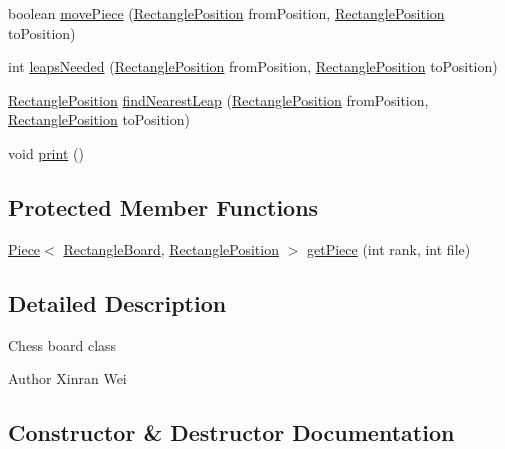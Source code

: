 \begin{DoxyCompactItemize}
\item 
boolean \hyperlink{classedu_1_1xwei12_1_1chess_1_1_rectangle_board_a476071ffa5222be6ea71f3fb82b7b8ff}{move\+Piece} (\hyperlink{classedu_1_1xwei12_1_1chess_1_1_rectangle_position}{Rectangle\+Position} from\+Position, \hyperlink{classedu_1_1xwei12_1_1chess_1_1_rectangle_position}{Rectangle\+Position} to\+Position)
\item 
int \hyperlink{classedu_1_1xwei12_1_1chess_1_1_rectangle_board_aeab8a752a9ea5b21569eff6decb53fd7}{leaps\+Needed} (\hyperlink{classedu_1_1xwei12_1_1chess_1_1_rectangle_position}{Rectangle\+Position} from\+Position, \hyperlink{classedu_1_1xwei12_1_1chess_1_1_rectangle_position}{Rectangle\+Position} to\+Position)
\item 
\hyperlink{classedu_1_1xwei12_1_1chess_1_1_rectangle_position}{Rectangle\+Position} \hyperlink{classedu_1_1xwei12_1_1chess_1_1_rectangle_board_ac0e3b5328b0ff0ac5dbc39688817da8c}{find\+Nearest\+Leap} (\hyperlink{classedu_1_1xwei12_1_1chess_1_1_rectangle_position}{Rectangle\+Position} from\+Position, \hyperlink{classedu_1_1xwei12_1_1chess_1_1_rectangle_position}{Rectangle\+Position} to\+Position)
\item 
void \hyperlink{classedu_1_1xwei12_1_1chess_1_1_rectangle_board_a2c0f4bdf89ab070895f93923774eb4ae}{print} ()
\end{DoxyCompactItemize}
\subsection*{Protected Member Functions}
\begin{DoxyCompactItemize}
\item 
\hyperlink{classedu_1_1xwei12_1_1chess_1_1_piece}{Piece}$<$ \hyperlink{classedu_1_1xwei12_1_1chess_1_1_rectangle_board}{Rectangle\+Board}, \hyperlink{classedu_1_1xwei12_1_1chess_1_1_rectangle_position}{Rectangle\+Position} $>$ \hyperlink{classedu_1_1xwei12_1_1chess_1_1_rectangle_board_a37e604e5a748f3d6fdeef458fb865049}{get\+Piece} (int rank, int file)
\end{DoxyCompactItemize}


\subsection{Detailed Description}
Chess board class \begin{DoxyAuthor}{Author}
Xinran Wei 
\end{DoxyAuthor}


\subsection{Constructor \& Destructor Documentation}
